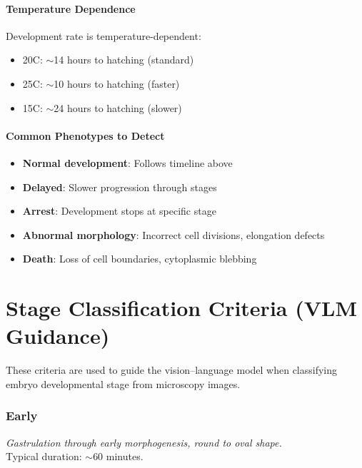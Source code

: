 \documentclass[11pt,letterpaper]{article}
\begin{document}
\subsection{Temperature Dependence}

Development rate is temperature-dependent:
\begin{itemize}
    \item 20\textdegree C: $\sim$14 hours to hatching (standard)
    \item 25\textdegree C: $\sim$10 hours to hatching (faster)
    \item 15\textdegree C: $\sim$24 hours to hatching (slower)
\end{itemize}

\subsection{Common Phenotypes to Detect}
\begin{itemize}
    \item \textbf{Normal development}: Follows timeline above
    \item \textbf{Delayed}: Slower progression through stages
    \item \textbf{Arrest}: Development stops at specific stage
    \item \textbf{Abnormal morphology}: Incorrect cell divisions, elongation defects
    \item \textbf{Death}: Loss of cell boundaries, cytoplasmic blebbing
\end{itemize}

\newpage


\part*{Stage Classification Criteria (VLM Guidance)}

These criteria are used to guide the vision--language model when classifying embryo developmental stage from microscopy images.

\section{Early}
\textit{Gastrulation through early morphogenesis, round to oval shape.}\\
Typical duration: $\sim$60 minutes.
\end{document}
